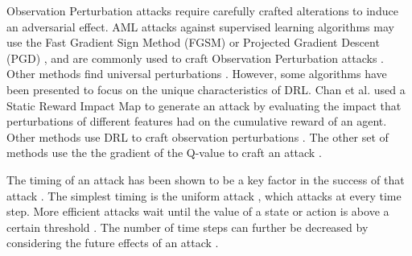 \documentclass[conference,compsoc]{IEEEtran}
\begin{document}
Observation Perturbation attacks require carefully crafted alterations to induce an adversarial effect. AML attacks against supervised learning algorithms may use the Fast Gradient Sign Method (FGSM) \cite{goodfellow_explaining_2015} or Projected Gradient Descent (PGD) \cite{madry_towards_2018}, and are commonly used to craft Observation Perturbation attacks \cite{fujimoto_adversarial_2021,tu_adversarial_2021,huang_adversarial_2017,praveen_kumar_critical_2021,kos_delving_2017,qiaoben_understanding_2021}. Other methods find universal perturbations \cite{hussenot_copycat_2020,huai_malicious_2020,tekgul_real-time_2022}. However, some algorithms have been presented to focus on the unique characteristics of DRL. Chan et al. \cite{chan_adversarial_2020} used a Static Reward Impact Map to generate an attack by evaluating the impact that perturbations of different features had on the cumulative reward of an agent. Other methods use DRL to craft observation perturbations \cite{russo_optimal_2019,tretschk_sequential_2018,sun_stealthy_2020,qiaoben_strategically-timed_2021}. The other set of methods use the the gradient of the Q-value to craft an attack \cite{praveen_kumar_critical_2021,zhang_robust_2020-1,pattanaik_robust_2018}. 

The timing of an attack has been shown to be a key factor in the success of that attack \cite{sun_stealthy_2020, huang_adversarial_2017, lin_tactics_2017, qiaoben_strategically-timed_2021}. The simplest timing is the uniform attack \cite{huang_adversarial_2017}, which attacks at every time step. More efficient attacks wait until the value of a state or action is above a certain threshold \cite{lin_tactics_2017, qiaoben_strategically-timed_2021}. The number of time steps can further be decreased by considering the future effects of an attack \cite{sun_stealthy_2020}.

\end{document}
